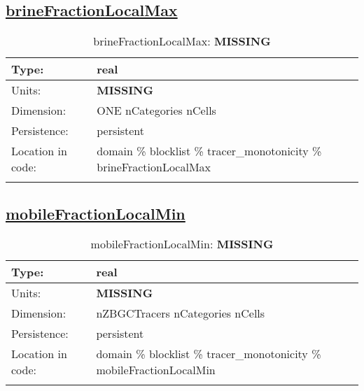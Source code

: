 \subsection[brineFractionLocalMax]{\hyperref[sec:var_tab_tracer_monotonicity]{brineFractionLocalMax}}
\label{subsec:var_sec_tracer_monotonicity_brineFractionLocalMax}
\begin{center}
\begin{longtable}{| p{2.0in} | p{4.0in} |}
        \hline 
        Type: & real \\
        \hline 
        Units: & {\bf \color{red} MISSING} \\
        \hline 
        Dimension: & ONE nCategories nCells \\
        \hline 
        Persistence: & persistent \\
        \hline 
         Location in code: & domain \% blocklist \% tracer\_monotonicity \% brineFractionLocalMax \\
         \hline 
    \caption{brineFractionLocalMax: {\bf \color{red} MISSING}}
\end{longtable}
\end{center}
\subsection[mobileFractionLocalMin]{\hyperref[sec:var_tab_tracer_monotonicity]{mobileFractionLocalMin}}
\label{subsec:var_sec_tracer_monotonicity_mobileFractionLocalMin}
\begin{center}
\begin{longtable}{| p{2.0in} | p{4.0in} |}
        \hline 
        Type: & real \\
        \hline 
        Units: & {\bf \color{red} MISSING} \\
        \hline 
        Dimension: & nZBGCTracers nCategories nCells \\
        \hline 
        Persistence: & persistent \\
        \hline 
         Location in code: & domain \% blocklist \% tracer\_monotonicity \% mobileFractionLocalMin \\
         \hline 
    \caption{mobileFractionLocalMin: {\bf \color{red} MISSING}}
\end{longtable}
\end{center}
